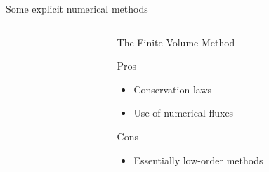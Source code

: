 \begin{withoutheadline}
\begin{frame}{Some explicit numerical methods}
\begin{overprint}
\begin{columns}
\begin{column}{0.49\textwidth}
        \end{column}
        \begin{column}{0.49\textwidth}
          \begin{block}{The Finite Volume Method \cite{Leveque}}
            \begin{footnotesize}
              \begin{block}{\footnotesize Pros}
                \vspace{-0.2cm}
                \begin{itemize}
                \item[] Conservation laws %
                \item[] Use of numerical fluxes \cite{Godunov_method}
                \end{itemize}
              \end{block}
              \vspace{-0.2cm}
              \begin{block}{\footnotesize Cons}
                \vspace{-0.2cm}
                \begin{itemize}
                \item[] Essentially low-order methods
                \end{itemize}
              \end{block}
            \end{footnotesize}
          \end{block}
        \end{column}
      \end{columns}
      \vspace{-0.3cm} 
      

\end{overprint}
\end{frame}
\end{withoutheadline}

